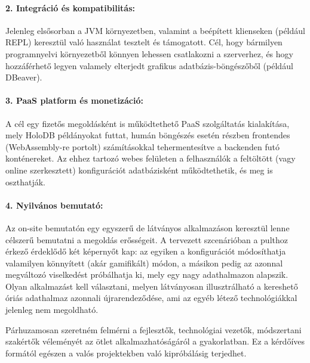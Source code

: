 \documentclass[12pt]{article}
\begin{document}
\paragraph{2. Integráció és kompatibilitás:}
Jelenleg elsősorban a JVM környezetben, valamint a beépített klienseken (például REPL) keresztül való használat tesztelt és támogatott.
Cél, hogy bármilyen programnyelvi környezetből könnyen lehessen csatlakozni a szerverhez,
és hogy hozzáférhető legyen valamely elterjedt grafikus adatbázis-böngészőből (például DBeaver).

\paragraph{3. PaaS platform és monetizáció:}
A cél egy fizetős megoldásként is működtethető \mbox{PaaS} szolgáltatás kialakítása,
mely HoloDB példányokat futtat,
humán böngészés esetén részben frontendes (WebAssembly-re portolt) számításokkal tehermentesítve a backenden futó konténereket.
Az ehhez tartozó webes felületen a felhasználók a feltöltött (vagy online szerkesztett)
konfigurációt adatbázisként működtethetik, és meg is oszthatják.

\paragraph{4. Nyilvános bemutató:}
Az on-site bemutatón egy egyszerű de látványos alkalmazáson keresztül lenne célszerű bemutatni a megoldás erősségeit.
A tervezett szcenárióban a pulthoz érkező érdeklődő két képernyőt kap:
az egyiken a konfigurációt módosíthatja valamilyen könnyített (akár gamifikált) módon,
a másikon pedig az azonnal megváltozó viselkedést próbálhatja ki, mely egy nagy adathalmazon alapszik.
Olyan alkalmazást kell választani, melyen látványosan illusztrálható a kereshető óriás adathalmaz azonnali újrarendeződése,
ami az egyéb létező technológiákkal jelenleg nem megoldható.

Párhuzamosan szeretném felmérni a fejlesztők, technológiai vezetők, módszertani szakértők véleményét az ötlet alkalmazhatóságáról a gyakorlatban.
Ez a kérdőíves formától egészen a valós projektekben való kipróbálásig terjedhet.
\end{document}
